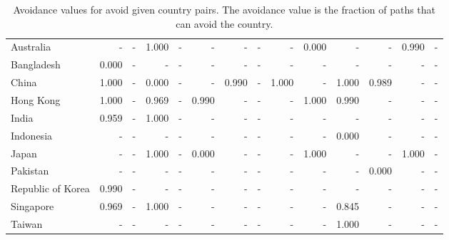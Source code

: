 \documentclass[10pt,twocolumn]{sig-alternate}
\begin{document}
\begin{table*}[t]
\begin{adjustbox}{width=1\textwidth}
\begin{tabular}{@{}ld{3.2}d{3.2}d{3.2}d{3.2}d{3.2}d{3.2}d{3.2}d{3.2}d{3.2}d{3.2}d{3.2}d{3.2}d{3.2}@{}}
Australia  & -  & -  & 1.000 & -  & -  & -  & -  & -  & 0.000 & -  & -  & 0.990 & - \\
Bangladesh  & 0.000 & -  & -  & -  & -  & -  & -  & -  & -  & -  & -  & -  & - \\
China  & 1.000 & -  & 0.000 & -  & -  & 0.990 & -  & 1.000 & -  & 1.000 & 0.989 & -  & - \\
Hong Kong  & 1.000 & -  & 0.969 & -  & 0.990 & -  & -  & -  & 1.000 & 0.990 & -  & -  & - \\
India  & 0.959 & -  & 1.000 & -  & -  & -  & -  & -  & -  & -  & -  & -  & - \\
Indonesia  & -  & -  & -  & -  & -  & -  & -  & -  & -  & 0.000 & -  & -  & - \\
Japan  & -  & -  & 1.000 & -  & 0.000 & -  & -  & -  & 1.000 & -  & -  & 1.000 & - \\
Pakistan  & -  & -  & -  & -  & -  & -  & -  & -  & -  & -  & 0.000 & -  & - \\
Republic of Korea  & 0.990 & -  & -  & -  & -  & -  & -  & -  & -  & -  & -  & -  & - \\
Singapore  & 0.969 & -  & 1.000 & -  & -  & -  & -  & -  & -  & 0.845 & -  & -  & - \\
Taiwan  & -  & -  & -  & -  & -  & -  & -  & -  & -  & 1.000 & -  & -  & - \\ \hline
\end{tabular}
\end{adjustbox}
\caption{Avoidance values for avoid given country pairs.  The avoidance value is the fraction of paths that can avoid the country.}
\label{tab:host}
\end{table*}
\end{document}
